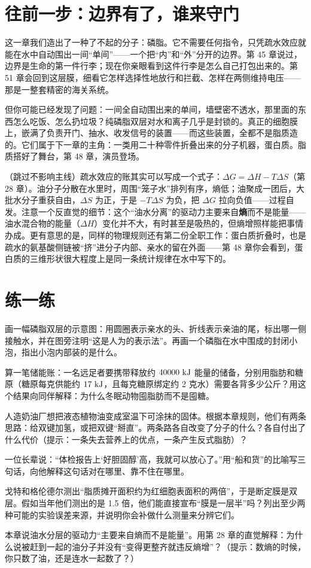 \section{往前一步：边界有了，谁来守门}

这一章我们造出了一种了不起的分子：磷脂。它不需要任何指令，只凭疏水效应就能在水中自动围出一间“单间”——一个把“内”和“外”分开的边界。第 45 章说过，边界是生命的第一件行李；现在你亲眼看到这件行李是怎么自己打包出来的。第 51 章会回到这层膜，细看它怎样选择性地放行和拦截、怎样在两侧维持电压——那是一整套精密的海关系统。

但你可能已经发现了问题：一间全自动围出来的单间，墙壁密不透水，那里面的东西怎么吃饭、怎么扔垃圾？纯磷脂双层对水和离子几乎是封锁的。真正的细胞膜上，嵌满了负责开门、抽水、收发信号的装置——而这些装置，全都不是脂质造的。它们属于下一章的主角：一类用二十种零件折叠出来的分子机器，蛋白质。脂质搭好了舞台，第 48 章，演员登场。

\begin{tiaozhan}
（跳过不影响主线）疏水效应的账其实可以写成一个式子：$\Delta G = \Delta H - T\Delta S$（第 28 章）。油分子分散在水里时，周围“笼子水”排列有序，熵低；油聚成一团后，大批水分子重获自由，$\Delta S$ 为正，于是 $-T\Delta S$ 为负，把 $\Delta G$ 拉向负值——过程自发。注意一个反直觉的细节：这个“油水分离”的驱动力主要来自\textbf{熵}而不是能量——油水混合物的能量（$\Delta H$）变化并不大，有时甚至是吸热的，但熵增照样能把事情办成。更有意思的是，同样的物理规则还有第二份全职工作：蛋白质折叠时，也是疏水的氨基酸侧链被“挤”进分子内部、亲水的留在外面——第 48 章你会看到，蛋白质的三维形状很大程度上是同一条统计规律在水中写下的。
\end{tiaozhan}

\section*{练一练}

\begin{sikaoti}
\item 画一幅磷脂双层的示意图：用圆圈表示亲水的头、折线表示亲油的尾，标出哪一侧接触水，并在图旁注明“这是人为的表示法”。再画一个磷脂在水中围成的封闭小泡，指出小泡内部装的是什么。
\item 算一笔储能账：一名远足者要携带释放约 $40000\ \mathrm{kJ}$ 能量的储备，分别用脂肪和糖原（糖原每克供能约 $17\ \mathrm{kJ}$，且每克糖原绑定约 2 克水）需要各背多少公斤？用这个结果向同伴解释：为什么冬眠动物囤脂肪而不是囤糖。
\item 人造奶油厂想把液态植物油变成室温下可涂抹的固体。根据本章规则，他们有两条思路：给双键加氢，或把双键“掰直”。两条路各自改变了分子的什么？各自付出了什么代价（提示：一条失去营养上的优点，一条产生反式脂肪）？
\item 一位长辈说：“体检报告上‘好胆固醇’高，我就可以放心了。”用“船和货”的比喻写三句话，向他解释这句话对在哪里、靠不住在哪里。
\item 戈特和格伦德尔测出“脂质摊开面积约为红细胞表面积的两倍”，于是断定膜是双层。假如当年他们测出的是 1.5 倍，他们能直接宣布“膜是一层半”吗？列出至少两种可能的实验误差来源，并说明你会补做什么测量来分辨它们。
\item 本章说油水分层的驱动力“主要来自熵而不是能量”。用第 28 章的直觉解释：为什么说被赶到一起的油分子并没有“变得更整齐就违反熵增”？（提示：数熵的时候，你只数了油，还是连水一起数了？）
\end{sikaoti}
